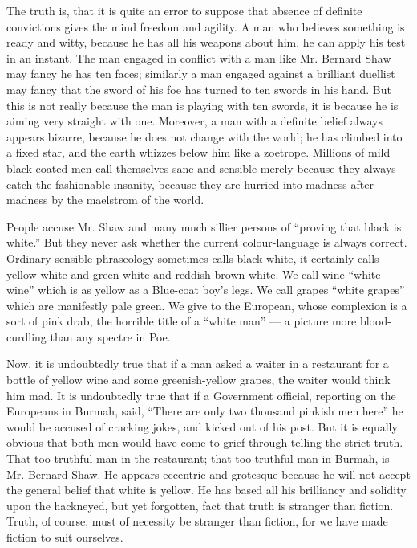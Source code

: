 The truth is, that it is quite an error to suppose that absence of definite convictions gives the mind freedom and agility. A man who believes something is ready and witty, because he has all his weapons about him. he can apply his test in an instant. The man engaged in conflict with a man like Mr. Bernard Shaw may fancy he has ten faces; similarly a man engaged against a brilliant duellist may fancy that the sword of his foe has turned to ten swords in his hand. But this is not really because the man is playing with ten swords, it is because he is aiming very straight with one. Moreover, a man with a definite belief always appears bizarre, because he does not change with the world; he has climbed into a fixed star, and the earth whizzes below him like a zoetrope. Millions of mild black-coated men call themselves sane and sensible merely because they always catch the fashionable insanity, because they are hurried into madness after madness by the maelstrom of the world.

People accuse Mr. Shaw and many much sillier persons of “proving that black is white.” But they never ask whether the current colour-language is always correct. Ordinary sensible phraseology sometimes calls black white, it certainly calls yellow white and green white and reddish-brown white. We call wine “white wine” which is as yellow as a Blue-coat boy’s legs. We call grapes “white grapes” which are manifestly pale green. We give to the European, whose complexion is a sort of pink drab, the horrible title of a “white man” — a picture more blood-curdling than any spectre in Poe.

Now, it is undoubtedly true that if a man asked a waiter in a restaurant for a bottle of yellow wine and some greenish-yellow grapes, the waiter would think him mad. It is undoubtedly true that if a Government official, reporting on the Europeans in Burmah, said, “There are only two thousand pinkish men here” he would be accused of cracking jokes, and kicked out of his post. But it is equally obvious that both men would have come to grief through telling the strict truth. That too truthful man in the restaurant; that too truthful man in Burmah, is Mr. Bernard Shaw. He appears eccentric and grotesque because he will not accept the general belief that white is yellow. He has based all his brilliancy and solidity upon the hackneyed, but yet forgotten, fact that truth is stranger than fiction. Truth, of course, must of necessity be stranger than fiction, for we have made fiction to suit ourselves.

